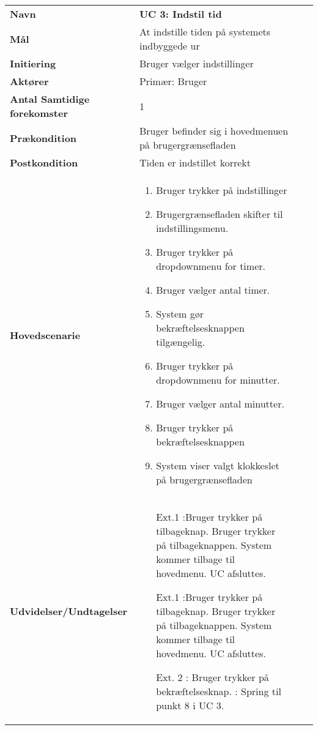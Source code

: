 \begin{longtable}{>{\bfseries}TX TX}
	Navn & \bfseries{UC 3: Indstil tid} \\
	Mål & At indstille tiden på systemets indbyggede ur\\
	Initiering & Bruger vælger indstillinger \\
	Aktører & Primær: Bruger \\
	Antal Samtidige forekomster & 1 \\
	Prækondition & Bruger befinder sig i hovedmenuen på brugergrænsefladen\\
	Postkondition & Tiden er indstillet korrekt \\
	Hovedscenarie & \begin{enumerate}
		\item Bruger trykker på indstillinger
		\item Brugergrænsefladen skifter til indstillingsmenu.
		\item Bruger trykker på dropdownmenu for timer.
		\item Bruger vælger antal timer.
		\item System gør bekræftelsesknappen tilgængelig.
		\item Bruger trykker på dropdownmenu for minutter.
		\item Bruger vælger antal minutter.
		\item Bruger trykker på bekræftelsesknappen 
		\item System viser valgt klokkeslet på brugergrænsefladen
	\end{enumerate} \\
	Udvidelser/Undtagelser & 
	\begin{enumerate}{}{}
		\item[Ext.1]:Bruger trykker på tilbageknap.
		\subitem[1.1] Bruger trykker på tilbageknappen.
		\subitem[1.2] System kommer tilbage til hovedmenu.	 
		\subitem[1.3]UC afsluttes. \newline 
	\end{enumerate}
	\begin{enumerate}{}{}
		\item[Ext.1]:Bruger trykker på tilbageknap.
		\subitem[1.1] Bruger trykker på tilbageknappen.
		\subitem[1.2] System kommer tilbage til hovedmenu.	 
		\subitem[1.3]UC afsluttes. \newline 
		\item [Ext. 2]: Bruger trykker på bekræftelsesknap.
		\subitem: Spring til punkt 8 i UC 3.
	\end{enumerate}
\end{longtable}